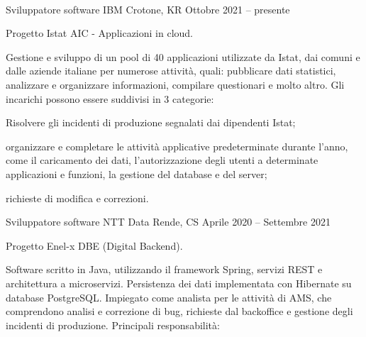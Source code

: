 \documentclass[]{style}
\begin{document}
\begin{center}
	  \\
	\vspace{2mm}
\end{center}

\begin{cventries}
	\cventry
	{Sviluppatore software}
	{IBM}
	{Crotone, KR}
	{Ottobre 2021 – presente}
	{\begin{cventryparagraph}
		\item {Progetto Istat AIC - Applicazioni in cloud.}
		\item {Gestione e sviluppo di un pool di 40 applicazioni utilizzate da Istat, dai comuni e dalle aziende italiane per numerose attività, quali: pubblicare dati statistici, analizzare e organizzare informazioni, compilare questionari e molto altro. Gli incarichi possono essere suddivisi in 3 categorie:}
    	{\begin{cventryparagraphlist}
    		\item {Risolvere gli incidenti di produzione segnalati dai dipendenti Istat;}
    		\item {organizzare e completare le attività applicative predeterminate durante l'anno, come il caricamento dei dati, l'autorizzazione degli utenti a determinate applicazioni e funzioni, la gestione del database e del server;}
    		\item {richieste di modifica e correzioni.}
    	\end{cventryparagraphlist}}
	\end{cventryparagraph}}
	\cventry
	{Sviluppatore software}
	{NTT Data}
	{Rende, CS}
	{Aprile 2020 – Settembre 2021}
	{\begin{cventryparagraph}
		\item {Progetto Enel-x DBE (Digital Backend).}
		\item {Software scritto in Java, utilizzando il framework Spring, servizi REST e architettura a microservizi. Persistenza dei dati implementata con Hibernate su database PostgreSQL. Impiegato come analista per le attività di AMS, che comprendono analisi e correzione di bug, richieste dal backoffice e gestione degli incidenti di produzione. Principali responsabilità:}
    	{\begin{cventryparagraphlist}

\end{cventryparagraphlist}}
\end{cventryparagraph}}
\end{cventries}
\end{document}
